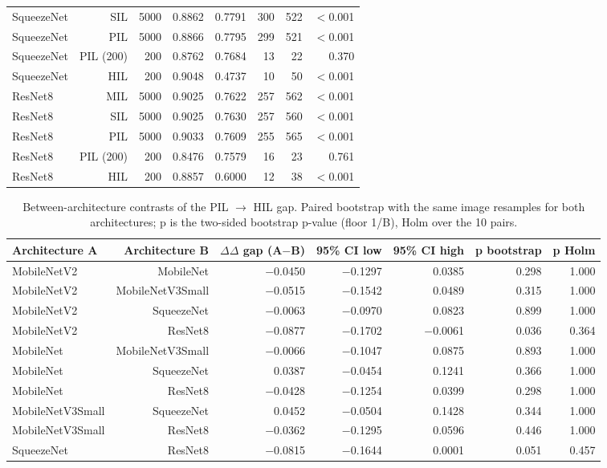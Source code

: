 \begin{table}[htbp]
\begin{tabular}{lrrrrrrr}
SqueezeNet & SIL & 5000 & 0.8862 & 0.7791 & 300 & 522 & $<$0.001 \\
SqueezeNet & PIL & 5000 & 0.8866 & 0.7795 & 299 & 521 & $<$0.001 \\
SqueezeNet & PIL (200) & 200 & 0.8762 & 0.7684 & 13 & 22 & 0.370 \\
SqueezeNet & HIL & 200 & 0.9048 & 0.4737 & 10 & 50 & $<$0.001 \\
ResNet8 & MIL & 5000 & 0.9025 & 0.7622 & 257 & 562 & $<$0.001 \\
ResNet8 & SIL & 5000 & 0.9025 & 0.7630 & 257 & 560 & $<$0.001 \\
ResNet8 & PIL & 5000 & 0.9033 & 0.7609 & 255 & 565 & $<$0.001 \\
ResNet8 & PIL (200) & 200 & 0.8476 & 0.7579 & 16 & 23 & 0.761 \\
ResNet8 & HIL & 200 & 0.8857 & 0.6000 & 12 & 38 & $<$0.001 \\
\bottomrule
\end{tabular}
\end{table}

\begin{table}[htbp]
\centering
\scriptsize
\caption{Between-architecture contrasts of the PIL $\rightarrow$ HIL gap. Paired bootstrap with the same image resamples for both architectures; p is the two-sided bootstrap p-value (floor 1/B), Holm over the 10 pairs.}
\label{tab:ladder-coco-6}
\begin{tabular}{lrrrrrr}
\toprule
Architecture A & Architecture B & $\Delta$$\Delta$ gap (A$-$B) & 95\% CI low & 95\% CI high & p bootstrap & p Holm \\
\midrule
MobileNetV2 & MobileNet & $-$0.0450 & $-$0.1297 & 0.0385 & 0.298 & 1.000 \\
MobileNetV2 & MobileNetV3Small & $-$0.0515 & $-$0.1542 & 0.0489 & 0.315 & 1.000 \\
MobileNetV2 & SqueezeNet & $-$0.0063 & $-$0.0970 & 0.0823 & 0.899 & 1.000 \\
MobileNetV2 & ResNet8 & $-$0.0877 & $-$0.1702 & $-$0.0061 & 0.036 & 0.364 \\
MobileNet & MobileNetV3Small & $-$0.0066 & $-$0.1047 & 0.0875 & 0.893 & 1.000 \\
MobileNet & SqueezeNet & 0.0387 & $-$0.0454 & 0.1241 & 0.366 & 1.000 \\
MobileNet & ResNet8 & $-$0.0428 & $-$0.1254 & 0.0399 & 0.298 & 1.000 \\
MobileNetV3Small & SqueezeNet & 0.0452 & $-$0.0504 & 0.1428 & 0.344 & 1.000 \\
MobileNetV3Small & ResNet8 & $-$0.0362 & $-$0.1295 & 0.0596 & 0.446 & 1.000 \\
SqueezeNet & ResNet8 & $-$0.0815 & $-$0.1644 & 0.0001 & 0.051 & 0.457 \\
\bottomrule
\end{tabular}
\end{table}

